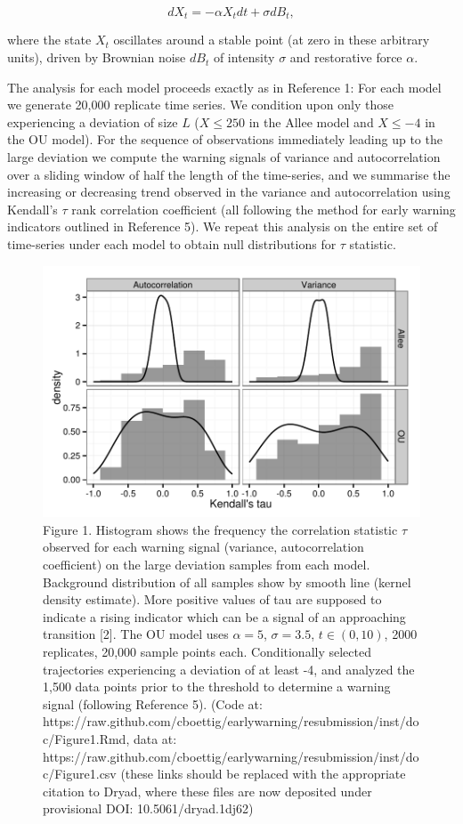 \documentclass{article}
\begin{document}
\[ dX_t = - \alpha X_t dt + \sigma dB_t, \]

where the state $X_t$ oscillates around a stable point (at zero in these
arbitrary units), driven by Brownian noise $dB_t$ of intensity $\sigma$
and restorative force $\alpha$.

The analysis for each model proceeds exactly as in Reference 1: For each
model we generate 20,000 replicate time series. We condition upon only
those experiencing a deviation of size $L$ ($X \leq 250$ in the Allee
model and $X \leq -4$ in the OU model). For the sequence of observations
immediately leading up to the large deviation we compute the warning
signals of variance and autocorrelation over a sliding window of half
the length of the time-series, and we summarise the increasing or
decreasing trend observed in the variance and autocorrelation using
Kendall's $\tau$ rank correlation coefficient (all following the method
for early warning indicators outlined in Reference 5). We repeat this
analysis on the entire set of time-series under each model to obtain
null distributions for $\tau$ statistic.

\begin{figure}[htbp]
\centering
\includegraphics{Figure1.pdf}
\caption{Figure 1. Histogram shows the frequency the correlation
statistic $\tau$ observed for each warning signal (variance,
autocorrelation coefficient) on the large deviation samples from each
model. Background distribution of all samples show by smooth line
(kernel density estimate). More positive values of tau are supposed to
indicate a rising indicator which can be a signal of an approaching
transition {[}2{]}. The OU model uses $\alpha = 5$, $\sigma=3.5$,
$t \in (0, 10)$, 2000 replicates, 20,000 sample points each.
Conditionally selected trajectories experiencing a deviation of at least
-4, and analyzed the 1,500 data points prior to the threshold to
determine a warning signal (following Reference 5). (Code at:
https://raw.github.com/cboettig/earlywarning/resubmission/inst/doc/Figure1.Rmd,
data at:
https://raw.github.com/cboettig/earlywarning/resubmission/inst/doc/Figure1.csv
(these links should be replaced with the appropriate citation to Dryad,
where these files are now deposited under provisional DOI:
10.5061/dryad.1dj62)}
\end{figure}
\end{document}
